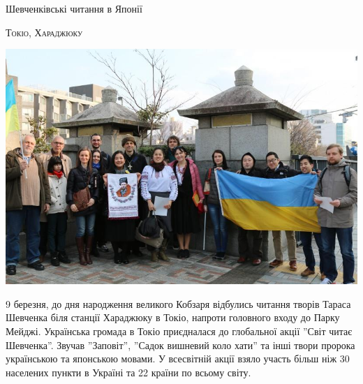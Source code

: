 \documentclass[10pt,a4paper]{article}
\newcommand{\NewsItem}[1]{%
		\usefont{T2A}{iwona}{m}{n} 
		\large #1 \vspace{4pt}
		\par \normalsize \normalfont}
\newcommand{\NewsAuthor}[1]{%
			\hfill \textsc{#1} \vspace{4pt}
			\par \normalfont}
\begin{document}
\begin{multicols}{3}
\vspace{1cm}
\NewsItem{Шевченківські читання в Японії}
\NewsAuthor{Токіо, Хараджюку}
		\begin{center}
			\includegraphics[width=0.8\linewidth]{images/shevchenko-reading}
		\end{center}
9 березня, до дня народження великого Кобзаря відбулись читання творів Тараса Шевченка біля станції Хараджюку в Токіо, напроти головного входу до Парку Мейджі. Українська громада в Токіо приєдналася до глобальної акції ''Світ читає Шевченка''. 
Звучав ''Заповіт'', ''Садок вишневий коло хати'' та інші твори пророка українською та японською мовами. 
У всесвітній акції взяло участь більш ніж 30 населених пункти в Україні та 22 країни по всьому світу.

\end{multicols}

\newpage
\end{document}
